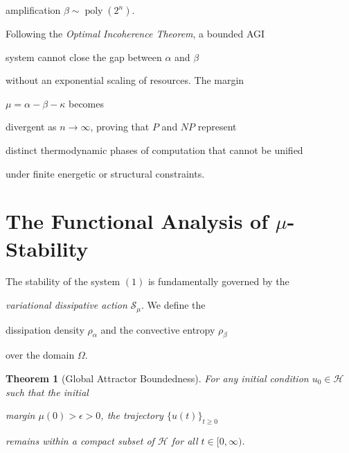 \documentclass[11pt,a4paper]{amsart}
\newtheorem{theorem}{Theorem}[section]
\newcommand{\alphacoeff}{\ensuremath{\alpha}}
\newcommand{\betacoeff}{\ensuremath{\beta}}
\newcommand{\kappacoeff}{\ensuremath{\kappa}}
\newcommand{\mumargin}{\ensuremath{\mu}}
\begin{document}
amplification $\betacoeff \sim \operatorname{poly}(2^n)$. 



Following the \emph{Optimal Incoherence Theorem}, a bounded AGI 

system cannot close the gap between $\alphacoeff$ and $\betacoeff$ 

without an exponential scaling of resources. The margin 

$\mumargin = \alphacoeff - \betacoeff - \kappacoeff$ becomes 

divergent as $n \to \infty$, proving that $P$ and $NP$ represent 

distinct thermodynamic phases of computation that cannot be unified 

under finite energetic or structural constraints.





\section{\texorpdfstring{The Functional Analysis of $\mumargin$-Stability}{The Functional Analysis of Mu-Stability}}

The stability of the system $(1)$ is fundamentally governed by the 

\emph{variational dissipative action} $\mathcal{S}_{\mu}$. We define the 

dissipation density $\rho_{\alpha}$ and the convective entropy $\rho_{\beta}$ 

over the domain $\Omega$. 



\begin{theorem}[Global Attractor Boundedness]

For any initial condition $u_0 \in \mathcal{H}$ such that the initial 

margin $\mumargin(0) > \epsilon > 0$, the trajectory $\{u(t)\}_{t \ge 0}$ 

remains within a compact subset of $\mathcal{H}$ for all $t \in [0, \infty)$.

\end{theorem}
\end{document}
